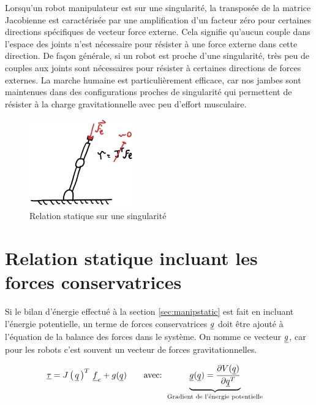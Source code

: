 Lorsqu'un robot manipulateur est sur une singularité, la transposée de la matrice Jacobienne est caractérisée par une amplification d'un facteur zéro pour certaines directions spécifiques de vecteur force externe. Cela signifie qu’aucun couple dans l'espace des joints n’est nécessaire pour résister à une force externe dans cette direction. De façon générale, si un robot est proche d'une singularité, très peu de couples aux joints sont nécessaires pour résister à certaines directions de forces externes. La marche humaine est particulièrement efficace, car nos jambes sont maintenues dans des configurations proches de singularité qui permettent de résister à la charge gravitationnelle avec peu d'effort musculaire.
\begin{figure}[H]
	\centering
	\includegraphics[width=0.40\textwidth]{fig/externalforcesingularity.jpg}
	\caption{Relation statique sur une singularité}
	\label{fig:externalforcesingularity}
\end{figure}


\section{Relation statique incluant les forces conservatrices}
\label{sec:manipstaticconservative}

Si le bilan d'énergie effectué à la section \ref{sec:manipstatic} est fait en incluant l'énergie potentielle, un terme de forces conservatrices $\underline{g}$ doit être ajouté à l'équation de la balance des forces dans le système. On nomme ce vecteur $\underline{g}$, car pour les robots c'est souvent un vecteur de forces gravitationnelles.

\begin{align}
	\underline{\tau} &= J\left( \, \underline{q} \, \right)^T \, \underline{f}_e +  g( \underline{q} )
	\quad \quad \text{avec:  }
	\underbrace{ \underline{g} ( \underline{q} ) =
		\frac{ \partial V(\underline{q} ) }{\partial \underline{q}^T }
	}_{\text{Gradient de l'énergie potentielle}}
	\label{eq:staticgravity}
\end{align}

